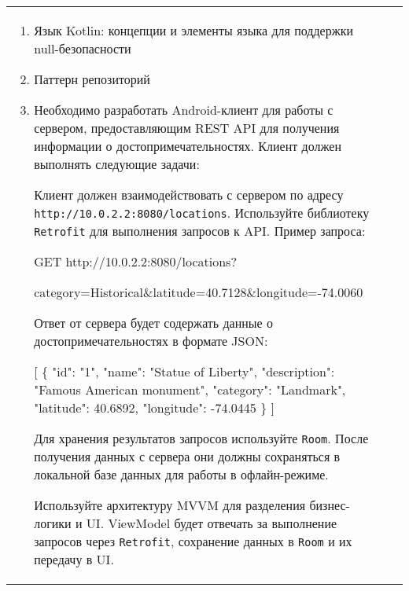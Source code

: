 \documentclass[a4paper]{article}
\begin{document}
\begin{tabular}{!{\vrule width 2pt}p{5cm}|p{6cm}|p{4cm}!{\vrule width 2pt}}
{\begin{minipage}{16cm}
\fontsize{14pt}{16pt}\selectfont\itshape
\begin{enumerate}
    \item Язык Kotlin: концепции и элементы языка для поддержки null-безопасности
    \item Паттерн репозиторий
    \item %

Необходимо разработать Android-клиент для работы с сервером, предоставляющим REST API для получения информации о достопримечательностях. Клиент должен выполнять следующие задачи:


Клиент должен взаимодействовать с сервером по адресу \texttt{http://10.0.2.2:8080/locations}. Используйте библиотеку \texttt{Retrofit} для выполнения запросов к API. Пример запроса:

 GET http://10.0.2.2:8080/locations?

     category=Historical\&latitude=40.7128\&longitude=-74.0060 

Ответ от сервера будет содержать данные о достопримечательностях в формате JSON:

 [ \{ "id": "1", "name": "Statue of Liberty", "description": "Famous American monument",
     "category": "Landmark", "latitude": 40.6892, "longitude": -74.0445 \} ] 


Для хранения результатов запросов используйте \texttt{Room}. После получения данных с сервера они должны сохраняться в локальной базе данных для работы в офлайн-режиме.


Используйте архитектуру MVVM для разделения бизнес-логики и UI. ViewModel будет отвечать за выполнение запросов через \texttt{Retrofit}, сохранение данных в \texttt{Room} и их передачу в UI.


\end{enumerate}
\end{minipage}}
\end{tabular}
\end{document}
